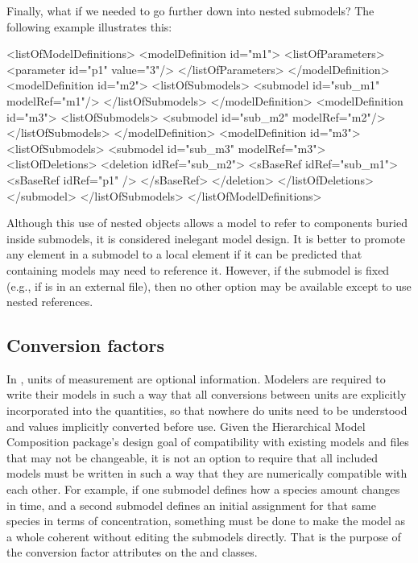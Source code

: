Finally, what if we needed to go further down into nested submodels?
The following example illustrates this:

\begin{example}
<listOfModelDefinitions> 
  <modelDefinition id="m1"> 
    <listOfParameters> 
      <parameter id="p1" value="3"/> 
    </listOfParameters> 
  </modelDefinition> 
  <modelDefinition id="m2"> 
    <listOfSubmodels> 
      <submodel id="sub_m1" modelRef="m1"/> 
    </listOfSubmodels>     
  </modelDefinition> 
  <modelDefinition id="m3"> 
    <listOfSubmodels> 
      <submodel id="sub_m2" modelRef="m2"/> 
    </listOfSubmodels>     
  </modelDefinition> 
  <modelDefinition id="m3"> 
    <listOfSubmodels> 
      <submodel id="sub_m3" modelRef="m3"> 
        <listOfDeletions> 
          <deletion idRef="sub_m2"> 
            <sBaseRef idRef="sub_m1"> 
              <sBaseRef idRef="p1" />
            </sBaseRef> 
          </deletion> 
        </listOfDeletions> 
      </submodel> 
    </listOfSubmodels>     
</listOfModelDefinitions> 
\end{example}


Although this use of nested \SBaseRef objects allows a model to refer to
components buried inside submodels, it is considered inelegant model
design.  It is better to promote any element in a submodel to a local
element if it can be predicted that containing models may need to
reference it.  However, if the submodel is fixed (e.g., if is in an
external file), then no other option may be available except to use
nested references.



\subsection{Conversion factors}
\label{conversion-factors}

In \sbmlthreecore, units of measurement are optional
information.  Modelers are required to write their models in such a way
that all conversions between units are explicitly incorporated into the
quantities, so that nowhere do units need to be understood and values
implicitly converted before use.  Given the Hierarchical Model
Composition package's design goal of compatibility with existing models
and files that may not be changeable, it is not an option to require
that all included models must be written in such a way that they are
numerically compatible with each other.  For example, if one submodel
defines how a species amount changes in time, and a second submodel
defines an initial assignment for that same species in terms of
concentration, something must be done to make the model as a whole
coherent without editing the submodels directly.  That is the purpose of
the conversion factor attributes on the \ReplacedElement and \Submodel
classes.


